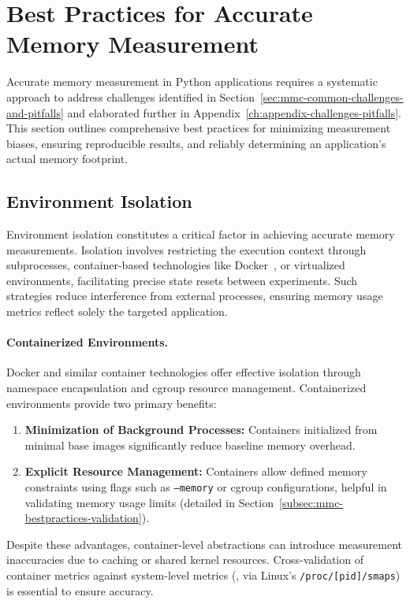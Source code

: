 \section{Best Practices for Accurate Memory Measurement}
\label{sec:mmc-best-practices}

Accurate memory measurement in Python applications requires a systematic approach to address challenges identified in Section~\ref{sec:mmc-common-challenges-and-pitfalls} and elaborated further in Appendix~\ref{ch:appendix-challenges-pitfalls}.
This section outlines comprehensive best practices for minimizing measurement biases, ensuring reproducible results, and reliably determining an application's actual memory footprint.

\subsection{Environment Isolation}
\label{subsec:mmc-bestpractices-env-isolation}

Environment isolation constitutes a critical factor in achieving accurate memory measurements.
Isolation involves restricting the execution context through subprocesses, container-based technologies like Docker~\cite{docker}, or virtualized environments, facilitating precise state resets between experiments.
Such strategies reduce interference from external processes, ensuring memory usage metrics reflect solely the targeted application.

\paragraph{Containerized Environments.}
Docker and similar container technologies offer effective isolation through namespace encapsulation and \ac{cgroup} resource management.
Containerized environments provide two primary benefits:
\begin{enumerate}
    \item \textbf{Minimization of Background Processes:} Containers initialized from minimal base images significantly reduce baseline memory overhead.
    \item \textbf{Explicit Resource Management:} Containers allow defined memory constraints using flags such as \texttt{–memory} or \ac{cgroup} configurations, helpful in validating memory usage limits (detailed in Section~\ref{subsec:mmc-bestpractices-validation}).
\end{enumerate}
Despite these advantages, container-level abstractions can introduce measurement inaccuracies due to caching or shared kernel resources.
Cross-validation of container metrics against system-level metrics (\eg, via Linux's \texttt{/proc/[pid]/smaps}) is essential to ensure accuracy.

